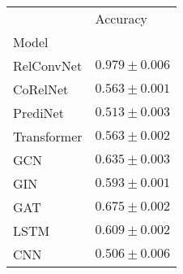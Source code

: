 \begin{tabular}{ll}
\toprule
{} &           Accuracy \\
Model       &                    \\
\midrule
RelConvNet  &  $0.979 \pm 0.006$ \\
CoRelNet    &  $0.563 \pm 0.001$ \\
PrediNet    &  $0.513 \pm 0.003$ \\
Transformer &  $0.563 \pm 0.002$ \\
GCN         &  $0.635 \pm 0.003$ \\
GIN         &  $0.593 \pm 0.001$ \\
GAT         &  $0.675 \pm 0.002$ \\
LSTM        &  $0.609 \pm 0.002$ \\
CNN         &  $0.506 \pm 0.006$ \\
\bottomrule
\end{tabular}
